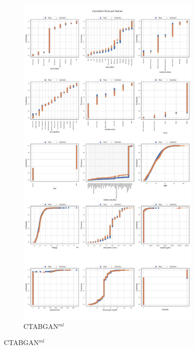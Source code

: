 \begin{landscape}
	\begin{figure}[h]
		\centering
		\hfill
		\begin{subfigure}{0.45\linewidth}
			\includegraphics[height=\textheight,width=\linewidth,keepaspectratio]{images/cumsums/ctabgan.jpg}
			\caption{CTABGAN$^{ml}$}
		\end{subfigure}

\end{figure}
\end{landscape}
